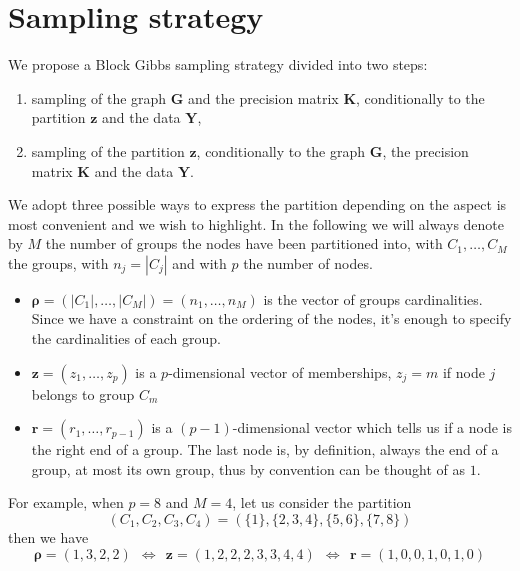 \section{Sampling strategy}
We propose a Block Gibbs sampling strategy divided into two steps: 
\begin{enumerate}
    \item sampling of the graph $\bm{G}$ and the precision matrix $\bm{K}$, conditionally to the partition $\bm{z}$ and the data $\bm{Y}$,
    \item sampling of the partition $\bm{z}$, conditionally to the graph $\bm{G}$, the precision matrix $\bm{K}$ and the data $\bm{Y}$.
\end{enumerate}
We adopt three possible ways to express the partition depending on the aspect is most convenient and we wish to highlight. In the following we will always denote by $M$ the number of groups the nodes have been partitioned into, with $C_{1}, \dotsc, C_{M}$ the groups, with $n_{j} = |C_{j}|$ and with $p$ the number of nodes.
\begin{itemize}
\item $\bm{\rho} =( |C_{1}| ,\dotsc ,|C_{M}|) =( n_{1} ,\dotsc ,n_{M})$ is the vector of groups cardinalities. Since we have a constraint on the ordering of the nodes, it's enough to specify the cardinalities of each group.
\item $\bm{z} =( z_{1} ,\dotsc ,z_{p})$ is a $p$-dimensional vector of memberships, $z_{j} =m$ if node $j$ belongs to group $C_{m}$
\item $\bm{r} =( r_{1} ,\dotsc ,r_{p-1})$ is a $( p-1)$-dimensional vector which tells us if a node is the right end of a group. The last node is, by definition, always the end of a group, at most its own group, thus by convention can be thought of as $1$.
\end{itemize}
For example, when $p=8$ and $M=4$, let us consider the partition
\[
    (C_{1}, C_{2}, C_{3}, C_{4}) = (\{1\},\{2,3,4\},\{5,6\},\{7,8\})
\]
then we have
\begin{equation*}
\bm{\rho} =( 1,3,2,2) \ \ \iff \ \ \bm{z} =( 1,2,2,2,3,3,4,4) \ \ \iff \ \ \bm{r} =( 1,0,0,1,0,1,0)
\end{equation*}

